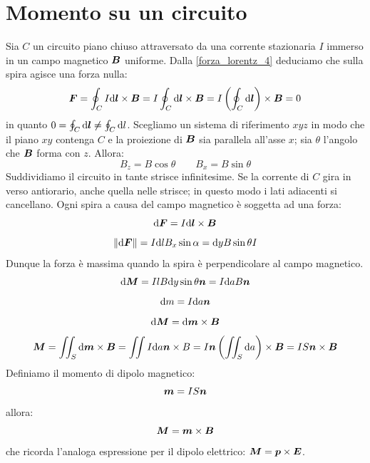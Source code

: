 \section{Momento su un circuito}
Sia $C$ un circuito piano chiuso attraversato da una corrente stazionaria $I$ immerso in un campo magnetico $\boldsymbol{B}$ uniforme. Dalla \eqref{forza_lorentz_4} deduciamo che sulla spira agisce una forza nulla:
\begin{equation*}\boldsymbol{F}=\oint_C I\mathrm{d}\boldsymbol{l}\times\boldsymbol{B}=I\oint_C\mathrm{d} \boldsymbol{l}\times\boldsymbol{B}=I\left(\oint_C\mathrm{d}\boldsymbol{l}\right)\times\boldsymbol{B}=0\end{equation*}
in quanto $0=\oint_C \mathrm{d} \boldsymbol{l}\neq\oint_C\mathrm{d} l$. Scegliamo un sistema di riferimento $xyz$ in modo che il piano $xy$ contenga $C$ e la proiezione di $\boldsymbol{B}$ sia parallela all'asse $x$; sia $\theta$ l'angolo che $\boldsymbol{B}$ forma con $z$. Allora:
\begin{equation*}B_z=B\cos\theta\qquad B_x=B\sin\theta\end{equation*}
Suddividiamo il circuito in tante strisce infinitesime. Se la corrente di $C$ gira in verso antiorario, anche quella nelle strisce; in questo modo i lati adiacenti si cancellano. Ogni spira a causa del campo magnetico è soggetta ad una forza:
\begin{equation*}\mathrm{d}\boldsymbol{F}=I\mathrm{d}\boldsymbol{l}\times\boldsymbol{B}\end{equation*}
\begin{equation*}\left\lVert\mathrm{d}\boldsymbol{F}\right\rVert=I\mathrm{d} lB_x\sin\alpha=\mathrm{d} yB\sin\theta I\end{equation*}
Dunque la forza è massima quando la spira è perpendicolare al campo magnetico.
\begin{equation*}\mathrm{d} \boldsymbol{M}=IlB\mathrm{d} y\sin\theta\boldsymbol{n}=I\mathrm{d} a B\boldsymbol{n}\end{equation*}
\begin{equation*}\mathrm{d} m=I\mathrm{d} a\boldsymbol{n}\end{equation*}
\begin{equation*}\mathrm{d}\boldsymbol{M}=\mathrm{d}\boldsymbol{m}\times\boldsymbol{B}\end{equation*}
\begin{equation*}\boldsymbol{M}=\iint_S\mathrm{d}\boldsymbol{m}\times \boldsymbol{B}=\iint I\mathrm{d} a\boldsymbol{n}\times B=I\boldsymbol{n}\left(\iint_S\mathrm{d} a\right)\times \boldsymbol{B}=IS\boldsymbol{n}\times \boldsymbol{B}\end{equation*}
Definiamo il momento di dipolo magnetico:
\begin{equation*}\boldsymbol{m}=IS\boldsymbol{n}\end{equation*}
allora:
\begin{equation*}\boldsymbol{M}=\boldsymbol{m}\times \boldsymbol{B}\end{equation*}
che ricorda l'analoga espressione per il dipolo elettrico: $\boldsymbol{M}=\boldsymbol{p}\times\boldsymbol{E}$.
